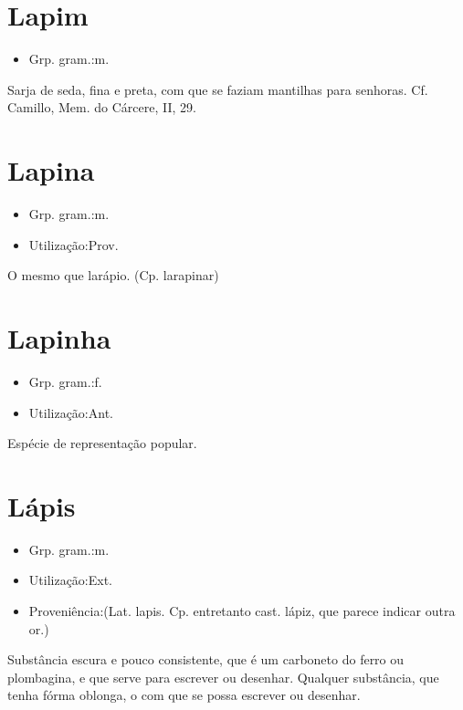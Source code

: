 \section{Lapim}
\begin{itemize}
\item {Grp. gram.:m.}
\end{itemize}
Sarja de seda, fina e preta, com que se faziam mantilhas para senhoras. Cf. Camillo, \textunderscore Mem. do Cárcere\textunderscore , II, 29.
\section{Lapina}
\begin{itemize}
\item {Grp. gram.:m.}
\end{itemize}
\begin{itemize}
\item {Utilização:Prov.}
\end{itemize}
O mesmo que \textunderscore larápio\textunderscore .
(Cp. \textunderscore larapinar\textunderscore )
\section{Lapinha}
\begin{itemize}
\item {Grp. gram.:f.}
\end{itemize}
\begin{itemize}
\item {Utilização:Ant.}
\end{itemize}
Espécie de representação popular.
\section{Lápis}
\begin{itemize}
\item {Grp. gram.:m.}
\end{itemize}
\begin{itemize}
\item {Utilização:Ext.}
\end{itemize}
\begin{itemize}
\item {Proveniência:(Lat. \textunderscore lapis\textunderscore . Cp. entretanto cast. \textunderscore lápiz\textunderscore , que parece indicar outra or.)}
\end{itemize}
Substância escura e pouco consistente, que é um carboneto do ferro ou plombagina, e que serve para escrever ou desenhar.
Qualquer substância, que tenha fórma oblonga, o com que se possa escrever ou desenhar.

